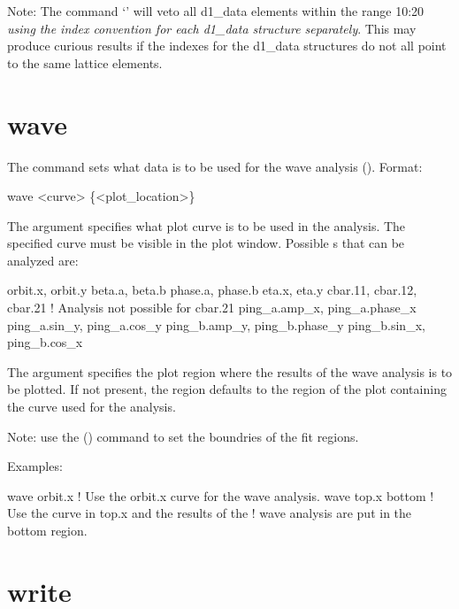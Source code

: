 {{{{{{Note: The command `' will veto all d1\_data elements within the
range 10:20 \textit{using the index convention for each d1\_data structure
separately}. This may produce curious results if the indexes for the d1\_data structures
do not all point to the same lattice elements.

\section{wave}
\label{s:wave}

The  command sets what data is to be used for the wave analysis (). 
Format:
\begin{example}
  wave <curve> \{<plot_location>\}
\end{example}

\vskip 7pt

The  argument specifies what plot curve is to be used in the analysis. The specified
curve must be visible in the plot window. Possible s that can be analyzed are:
\begin{example}
  orbit.x, orbit.y
  beta.a,  beta.b
  phase.a, phase.b
  eta.x, eta.y
  cbar.11, cbar.12, cbar.21      ! Analysis not possible for cbar.21
  ping_a.amp_x, ping_a.phase_x
  ping_a.sin_y, ping_a.cos_y
  ping_b.amp_y, ping_b.phase_y
  ping_b.sin_x, ping_b.cos_x
\end{example}

The  argument
specifies the plot region where the results of the wave analysis is to be plotted. If not
present, the region defaults to the region of the plot containing the curve used for the
analysis.

Note: use the  () command to set the boundries of the fit regions.

Examples:
\begin{example}
  wave orbit.x      ! Use the orbit.x curve for the wave analysis.
  wave top.x bottom ! Use the curve in top.x and the results of the 
                    !  wave analysis are put in the bottom region.
\end{example}

\section{write}
\label{s:write}

}}}}}}
